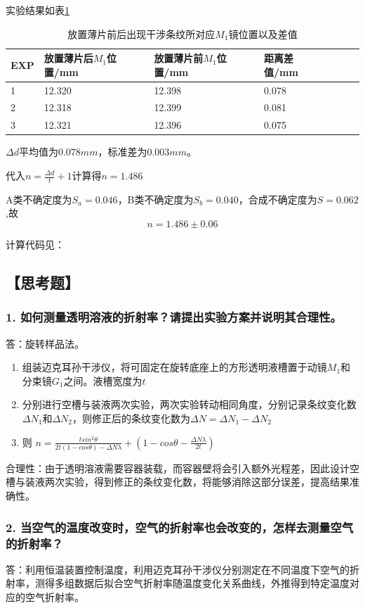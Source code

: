 \documentclass[12pt,a4paper,UTF8]{ctexart}
\begin{document}
		实验结果如表\ref{tab:1}
		\begin{table}[htbp]
			\centering
			\begin{tabular}{|l|l|l|l|l|l|l|}
			\hline
			EXP & 放置薄片后$M_1$位置/mm & 放置薄片前$M_1$位置/mm & 距离差值/mm \\ \hline
			1 & 12.320 & 12.398 & 0.078 \\ \hline
			2 & 12.318 & 12.399 & 0.081 \\ \hline
			3 & 12.321 & 12.396 & 0.075 \\ \hline
			\end{tabular}
			\caption{放置薄片前后出现干涉条纹所对应$M_1$镜位置以及差值}
			\label{tab:1}
		\end{table}

		$\Delta d$平均值为$0.078mm$，标准差为$0.003mm$。
		
		代入$n = \frac{\Delta d}{t}+1$计算得$n = 1.486$

		A类不确定度为$S_a = 0.046$，B类不确定度为$S_b = 0.040$，合成不确定度为$S = 0.062$,故
		$$
		n = 1.486 \pm 0.06
		$$
		
		计算代码见：
		

\subsection*{【思考题】}
	\subsubsection*{1. 如何测量透明溶液的折射率？请提出实验方案并说明其合理性。}
		答：旋转样品法。
		\begin{enumerate}[label=\arabic*.]
			\item 组装迈克耳孙干涉仪，将可固定在旋转底座上的方形透明液槽置于动镜$M_1$和分束镜$G_1$之间。液槽宽度为$t$		
			\item 分别进行空槽与装液两次实验，两次实验转动相同角度，分别记录条纹变化数$\Delta N_1$和$\Delta N_2$，则修正后的条纹变化数为$\Delta N=\Delta N_1-\Delta N_2$
			\item 则 $n = \frac{tsin^2\theta}{2t(1-cos\theta)-\Delta N \lambda}+ (1-cos\theta-\frac{\Delta N \lambda}{2t})$
		\end{enumerate}
		合理性：由于透明溶液需要容器装载，而容器壁将会引入额外光程差，因此设计空槽与装液两次实验，得到修正的条纹变化数，将能够消除这部分误差，提高结果准确性。
	\subsubsection*{2. 当空气的温度改变时，空气的折射率也会改变的，怎样去测量空气的折射率？}
		答：利用恒温装置控制温度，利用迈克耳孙干涉仪分别测定在不同温度下空气的折射率，测得多组数据后拟合空气折射率随温度变化关系曲线，外推得到特定温度对应的空气折射率。
\end{document}
